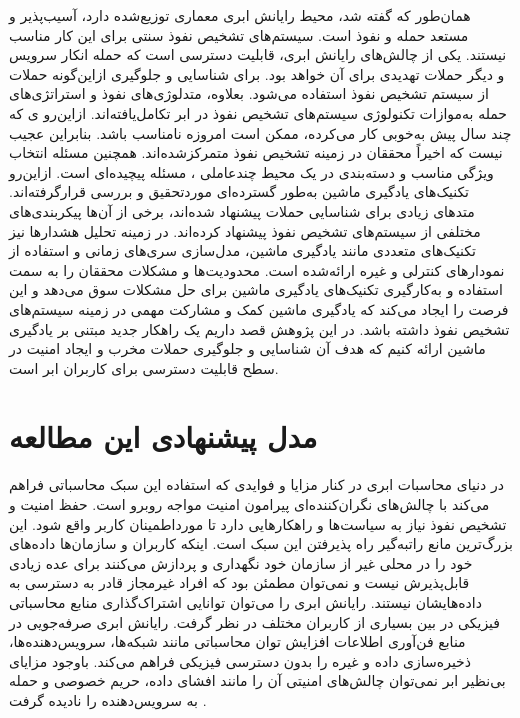 \documentclass[a4paper,oneside,12pt]{report}
\begin{document}
همان‌طور که گفته شد، محیط رایانش ابری معماری توزیع‌شده دارد، آسیب‌پذیر و مستعد حمله و نفوذ است. سیستم‌های تشخیص نفوذ سنتی برای این کار مناسب نیستند. یکی از چالش‌های رایانش ابری، قابلیت دسترسی است که حمله انکار سرویس 
و دیگر حملات تهدیدی برای آن خواهد بود. برای شناسایی و جلوگیری ازاین‌گونه حملات از سیستم تشخیص نفوذ استفاده می‌شود. بعلاوه، متدلوژی‌های نفوذ و استراتژی‌های حمله به‌موازات تکنولوژی سیستم‌های تشخیص نفوذ در ابر تکامل‌یافته‌اند. ازاین‌رو 
ی 
که چند سال پیش به‌خوبی کار می‌کرده، ممکن است امروزه نامناسب باشد. بنابراین عجیب نیست که اخیراً محققان در زمینه تشخیص نفوذ متمرکزشده‌اند. همچنین مسئله انتخاب ویژگی مناسب و دسته‌بندی در یک محیط چندعاملی%
، 
مسئله پیچیده‌ای است. ازاین‌رو تکنیک‌های یادگیری ماشین به‌طور گسترده‌ای موردتحقیق و بررسی قرارگرفته‌اند. متدهای زیادی برای شناسایی حملات پیشنهاد شده‌اند، برخی از آن‌ها پیکربندی‌های مختلفی از سیستم‌های تشخیص نفوذ پیشنهاد کرده‌اند. در زمینه تحلیل هشدارها نیز تکنیک‌های متعددی مانند یادگیری ماشین، مدل‌سازی سری‌های زمانی%
و استفاده از نمودارهای کنترلی%
و غیره ارائه‌شده است. محدودیت‌ها و مشکلات محققان را به سمت استفاده و به‌کارگیری تکنیک‌های یادگیری ماشین برای حل مشکلات سوق می‌دهد و این فرصت را ایجاد می‌کند که یادگیری ماشین کمک و مشارکت مهمی در زمینه سیستم‌های تشخیص نفوذ داشته باشد. در این پژوهش قصد داریم یک راهکار جدید مبتنی بر یادگیری ماشین ارائه کنیم که هدف آن شناسایی و جلوگیری حملات مخرب و ایجاد امنیت در سطح قابلیت دسترسی برای کاربران ابر است.
\section{مدل پیشنهادی این مطالعه}
در دنیای محاسبات ابری در کنار مزایا و فوایدی که استفاده این سبک محاسباتی فراهم می‌کند با چالش‌های نگران‌کننده‌ای پیرامون امنیت مواجه روبرو است. حفظ امنیت و تشخیص نفوذ نیاز به سیاست‌ها و راهکارهایی دارد تا مورداطمینان کاربر واقع شود. این بزرگ‌ترین مانع راتبه‌گیر راه پذیرفتن این سبک است. اینکه کاربران و سازمان‌ها داده‌های خود را در محلی غیر از سازمان خود نگهداری و پردازش می‌کنند برای عده زیادی قابل‌پذیرش نیست و نمی‌توان مطمئن بود که افراد غیرمجاز قادر به دسترسی به داده‌هایشان نیستند. رایانش ابری%
را می‌توان توانایی اشتراک‌گذاری منابع محاسباتی فیزیکی در بین بسیاری از کاربران مختلف در نظر گرفت. رایانش ابری صرفه‌جویی در منابع فن‌آوری اطلاعات افزایش توان محاسباتی مانند شبکه‌ها، سرویس‌دهنده‌ها، ذخیره‌سازی داده و غیره را بدون دسترسی فیزیکی فراهم می‌کند. باوجود مزایای بی‌نظیر ابر%
نمی‌توان چالش‌های امنیتی آن را مانند افشای داده، حریم خصوصی و حمله به سرویس‌دهنده را نادیده گرفت
\cite{7}.
\end{document}
